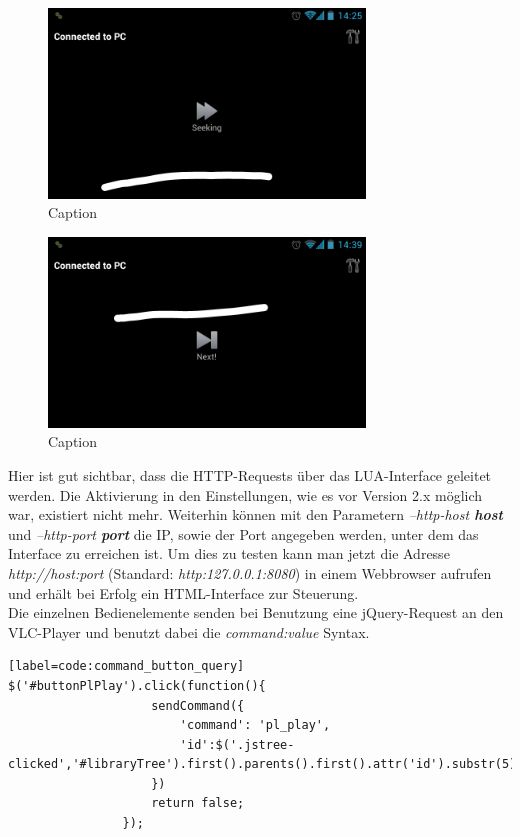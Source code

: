 \documentclass[a4paper,12pt]{article}
\begin{document}
\begin{figure}[H]
\centering
\includegraphics[width=0.75\textwidth]{Screenshot_10.png}
\caption{Caption}
\end{figure}

\begin{figure}[H]
\centering
\includegraphics[width=0.75\textwidth]{Screenshot_11.png}
\caption{Caption}
\end{figure}
Hier ist gut sichtbar, dass die HTTP-Requests über das LUA-Interface geleitet werden. Die Aktivierung in den Einstellungen, wie es vor Version 2.x möglich war, existiert nicht mehr. Weiterhin können mit den Parametern  \textit{--http-host \textbf{host}} und \textit{--http-port \textbf{port}} die IP, sowie der Port angegeben werden, unter dem das Interface zu erreichen ist. Um dies zu testen kann man jetzt die Adresse \textit{http://host:port} (Standard: \textit{http:127.0.0.1:8080}) in einem Webbrowser aufrufen und erhält bei Erfolg ein HTML-Interface zur Steuerung. \\
Die einzelnen Bedienelemente senden bei Benutzung eine jQuery-Request an den VLC-Player und benutzt dabei die \textit{command:value} Syntax.
\begin{lstlisting}[caption=Play Button Command][label=code:command_button_query]
$('#buttonPlPlay').click(function(){
					sendCommand({
						'command': 'pl_play',
						'id':$('.jstree-clicked','#libraryTree').first().parents().first().attr('id').substr(5)
					})
					return false;
				});
\end{lstlisting}
\end{document}
